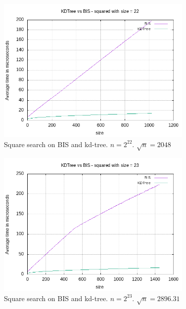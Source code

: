 \begin{figure}[h]
    \centering
    \includegraphics[width = 0.85\textwidth]{pictures/analysis/sqrt_22.png}
    \caption{Square search on BIS and kd-tree. $n=2^{22}$. $\sqrt{n} = 2048$}\label{fig:sqrt_22}
\end{figure}

\begin{figure}[h]
    \centering
    \includegraphics[width = 0.85\textwidth]{pictures/analysis/sqrt_23.png}
    \caption{Square search on BIS and kd-tree. $n=2^{23}$. $\sqrt{n} = 2896.31$}\label{fig:sqrt_23}
\end{figure}


